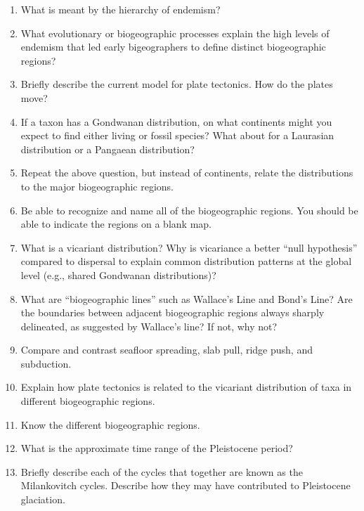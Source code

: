 \documentclass[letterpaper]{tufte-handout}
\begin{document}
\begin{enumerate}

	\item What is meant by the hierarchy of endemism?  

	\item What evolutionary or biogeographic processes explain the high levels of endemism that led early bigeographers to define distinct biogeographic regions?

	\item Briefly describe the current model for plate tectonics.  How do the plates move?  

	\item If a taxon has a Gondwanan distribution, on what continents might you expect to find either living or fossil species?  What about for a Laurasian distribution or a Pangaean distribution?  

	\item Repeat the above question, but instead of continents, relate the distributions to the major biogeographic regions.

	\item Be able to recognize and name all of the biogeographic regions.  You should be able to indicate the regions on a blank map.

	\item What is a vicariant distribution?  Why is vicariance a better “null hypothesis” compared to dispersal to explain common distribution patterns at the global level (e.g., shared Gondwanan distributions)?

	\item What are “biogeographic lines” such as Wallace’s Line and Bond’s Line?   Are the boundaries between adjacent biogeographic regions always sharply delineated, as suggested by Wallace’s line?  If not, why not?

	\item Compare and contrast seafloor spreading, slab pull, ridge push, and subduction.
	
	\item Explain how plate tectonics is related to the vicariant distribution of taxa in different biogeographic regions.
	
	\item Know the different biogeographic regions.
	
	\item What is the approximate time range of the Pleistocene period?

	\item Briefly describe each of the cycles that together are known as the Milankovitch cycles.  Describe how they may have contributed to Pleistocene glaciation. 


\end{enumerate}
\end{document}
